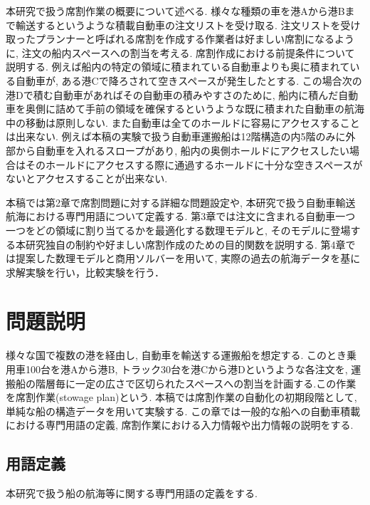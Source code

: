 \documentclass[a4j,11pt,twocolumn]{jsarticle}
\begin{document}
本研究で扱う席割作業の概要について述べる. 様々な種類の車を港Aから港Bまで輸送するというような積載自動車の注文リストを受け取る. 注文リストを受け取ったプランナーと呼ばれる席割を作成する作業者は好ましい席割になるように, 注文の船内スペースへの割当を考える. 席割作成における前提条件について説明する. 例えば船内の特定の領域に積まれている自動車よりも奥に積まれている自動車が, ある港Cで降ろされて空きスペースが発生したとする. この場合次の港Dで積む自動車があればその自動車の積みやすさのために, 船内に積んだ自動車を奥側に詰めて手前の領域を確保するというような既に積まれた自動車の航海中の移動は原則しない. また自動車は全てのホールドに容易にアクセスすることは出来ない. 例えば本稿の実験で扱う自動車運搬船は12階構造の内5階のみに外部から自動車を入れるスロープがあり, 船内の奥側ホールドにアクセスしたい場合はそのホールドにアクセスする際に通過するホールドに十分な空きスペースがないとアクセスすることが出来ない.

本稿では第2章で席割問題に対する詳細な問題設定や, 本研究で扱う自動車輸送航海における専門用語について定義する.  第3章では注文に含まれる自動車一つ一つをどの領域に割り当てるかを最適化する数理モデルと, そのモデルに登場する本研究独自の制約や好ましい席割作成のための目的関数を説明する. 第4章では提案した数理モデルと商用ソルバーを用いて, 実際の過去の航海データを基に求解実験を行い，比較実験を行う．

\section{問題説明}
様々な国で複数の港を経由し, 自動車を輸送する運搬船を想定する. このとき乗用車100台を港Aから港B, トラック30台を港Cから港Dというような各注文を, 運搬船の階層毎に一定の広さで区切られたスペースへの割当を計画する.この作業を席割作業(stowage plan)\cite{stowage}という. 本稿では席割作業の自動化の初期段階として, 単純な船の構造データを用いて実験する. この章では一般的な船への自動車積載における専門用語の定義, 席割作業における入力情報や出力情報の説明をする.

\subsection{用語定義}
本研究で扱う船の航海等に関する専門用語の定義をする.
\end{document}
